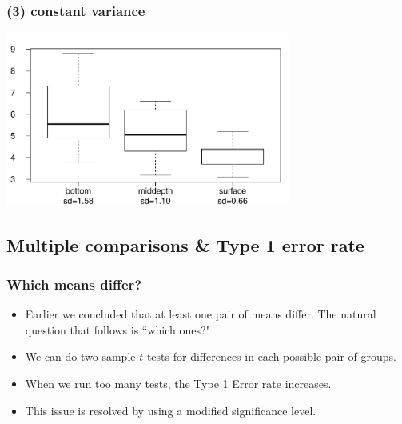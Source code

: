 \documentclass[notes,11pt, aspectratio=169]{beamer}
\begin{document}

\begin{frame}[fragile]
\frametitle{(3) constant variance}


\begin{center}
\includegraphics[width=0.7\textwidth]{graphs/homo}
\end{center}

\end{frame}


\subsection{Multiple comparisons \& Type 1 error rate}


\begin{frame}
\frametitle{Which means differ?}

\begin{itemize}

\item Earlier we concluded that at least one pair of means differ. The natural question that follows is ``which ones?"

\pause

\item We can do two sample $t$ tests for differences in each possible pair of groups.

\pause

\end{itemize}


\pause

\begin{itemize}

\item When we run too many tests, the Type 1 Error rate increases.

\item This issue is resolved by using a modified significance level.

\end{itemize}

\end{frame}
\end{document}
